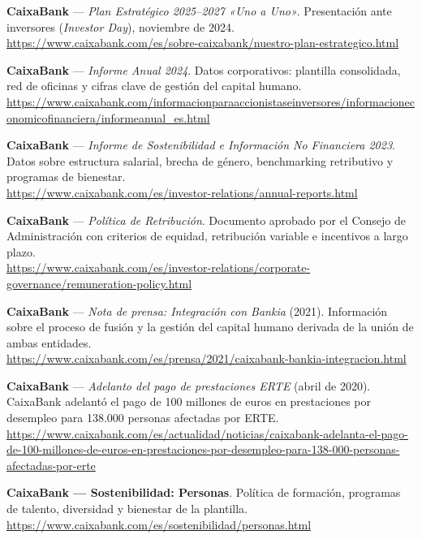 \begin{enumerate}[label={[\arabic*]}]

  \item \textbf{CaixaBank} --- \textit{Plan Estratégico 2025--2027 «Uno a Uno»}.
        Presentación ante inversores (\textit{Investor Day}), noviembre de 2024.\\
        \url{https://www.caixabank.com/es/sobre-caixabank/nuestro-plan-estrategico.html}

  \item \textbf{CaixaBank} --- \textit{Informe Anual 2024}. Datos corporativos:
        plantilla consolidada, red de oficinas y cifras clave de gestión del capital humano.\\
        \url{https://www.caixabank.com/informacionparaaccionistaseinversores/informacioneconomicofinanciera/informeanual_es.html}

  \item \textbf{CaixaBank} --- \textit{Informe de Sostenibilidad e Información
        No Financiera 2023}. Datos sobre estructura salarial, brecha de género,
        benchmarking retributivo y programas de bienestar.\\
        \url{https://www.caixabank.com/es/investor-relations/annual-reports.html}

  \item \textbf{CaixaBank} --- \textit{Política de Retribución}.
        Documento aprobado por el Consejo de Administración con criterios de equidad,
        retribución variable e incentivos a largo plazo.\\
        \url{https://www.caixabank.com/es/investor-relations/corporate-governance/remuneration-policy.html}

  \item \textbf{CaixaBank} --- \textit{Nota de prensa: Integración con Bankia} (2021).
        Información sobre el proceso de fusión y la gestión del capital humano derivada
        de la unión de ambas entidades.\\
        \url{https://www.caixabank.com/es/prensa/2021/caixabank-bankia-integracion.html}

  \item \textbf{CaixaBank} --- \textit{Adelanto del pago de prestaciones ERTE} (abril de 2020).
        CaixaBank adelantó el pago de 100 millones de euros en prestaciones por desempleo
        para 138.000 personas afectadas por ERTE.\\
        \url{https://www.caixabank.com/es/actualidad/noticias/caixabank-adelanta-el-pago-de-100-millones-de-euros-en-prestaciones-por-desempleo-para-138-000-personas-afectadas-por-erte}

  \item \textbf{CaixaBank --- Sostenibilidad: Personas}.
        Política de formación, programas de talento, diversidad y bienestar de la plantilla.\\
        \url{https://www.caixabank.com/es/sostenibilidad/personas.html}

\end{enumerate}

